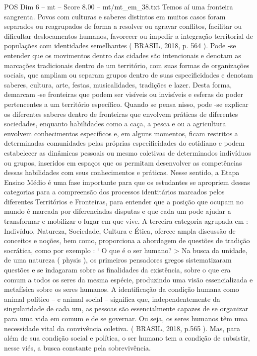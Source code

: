 \begin{textsample}{POS Dim 6 – mt – Score 8.00 – mt/mt\_em\_38.txt}
Temos aí uma fronteira sangrenta.
Povos com culturas e saberes distintos em muitos casos foram separados ou reagrupados de forma a resolver ou agravar conflitos, facilitar ou dificultar deslocamentos humanos, favorecer ou impedir a integração territorial de populações com identidades semelhantes ( BRASIL, 2018, p. 564 ).
Pode -se entender que os movimentos dentro das cidades são intencionais e denotam as marcações tradicionais dentro de um território, com suas formas de organizações sociais, que ampliam ou separam grupos dentro de suas especificidades e denotam saberes, cultura, arte, festas, musicalidades, tradições e lazer.
Desta forma, demarcam -se fronteiras que podem ser visíveis ou invisíveis e esferas do poder pertencentes a um território específico.
Quando se pensa nisso, pode -se explicar os diferentes saberes dentro de fronteiras que envolvem práticas de diferentes sociedades, enquanto habilidades como a caça, a pesca e ou a agricultura envolvem conhecimentos específicos e, em alguns momentos, ficam restritos a determinadas comunidades pelas próprias especificidades do cotidiano e podem estabelecer as dinâmicas pessoais ou mesmo coletivas de determinados indivíduos ou grupos, inseridos em espaços que os permitam desenvolver as competências dessas habilidades com seus conhecimentos e práticas.
Nesse sentido, a Etapa Ensino Médio é uma fase importante para que os estudantes se apropriem dessas categorias para a compreensão dos processos identitários marcados pelos diferentes Territórios e Fronteiras, para entender que a posição que ocupam no mundo é marcada por diferenciadas disputas e que cada um pode ajudar a transformar e mobilizar o lugar em que vive.
A terceira categoria agrupada em : Indivíduo, Natureza, Sociedade, Cultura e Ética, oferece ampla discussão de conceitos e noções, bem como, proporciona a abordagem de questões de tradição socrática, como por exemplo : ‘ O que é o ser humano? > Na busca da unidade, de uma natureza ( physis ), os primeiros pensadores gregos sistematizaram questões e se indagaram sobre as finalidades da existência, sobre o que era comum a todos os seres da mesma espécie, produzindo uma visão essencializada e metafísica sobre os seres humanos.
A identificação da condição humana como animal político – e animal social – significa que, independentemente da singularidade de cada um, as pessoas são essencialmente capazes de se organizar para uma vida em comum e de se governar.
Ou seja, os seres humanos têm uma necessidade vital da convivência coletiva. ( BRASIL, 2018, p.565 ).
Mas, para além de sua condição social e política, o ser humano tem a condição de subsistir, nesse viés, a busca constante pela sobrevivência.

\end{textsample}
